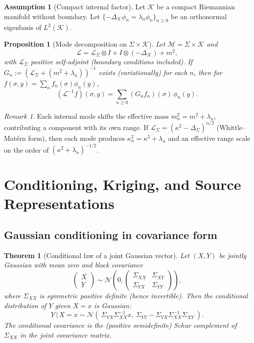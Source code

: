 \documentclass[11pt]{article}
\theoremstyle{definition}
\newtheorem{assumption}{Assumption}[section]
\theoremstyle{plain}
\newtheorem{theorem}{Theorem}[section]
\newtheorem{proposition}{Proposition}[section]
\theoremstyle{remark}
\newtheorem{remark}{Remark}[section]
\begin{document}
\begin{assumption}[Compact internal factor]\label{ass:compact}
Let $\mathcal{K}$ be a compact Riemannian manifold without boundary.
Let $\{-\Delta_{\mathcal{K}}\phi_n=\lambda_n\phi_n\}_{n\ge 0}$ be an orthonormal eigenbasis of $L^2(\mathcal{K})$.
\end{assumption}

\begin{proposition}[Mode decomposition on $\Sigma\times\mathcal{K}$]\label{prop:kk}
Let $\mathcal{M}=\Sigma\times\mathcal{K}$ and
\[
\mathcal{L}=\mathcal{L}_\Sigma\otimes I + I\otimes(-\Delta_{\mathcal{K}})+m^2,
\]
with $\mathcal{L}_\Sigma$ positive self-adjoint (boundary conditions included).
If $G_n:=(\mathcal{L}_\Sigma+(m^2+\lambda_n))^{-1}$ exists (variationally) for each $n$, then
for $f(\sigma,y)=\sum_n f_n(\sigma)\phi_n(y)$,
\[
(\mathcal{L}^{-1}f)(\sigma,y)=\sum_{n\ge 0} (G_n f_n)(\sigma)\,\phi_n(y).
\]
\end{proposition}

\begin{remark}
Each internal mode shifts the effective mass $m_n^2=m^2+\lambda_n$, contributing a component with its own range.
If $\mathcal{L}_\Sigma=(\kappa^2-\Delta_\Sigma)^{\alpha/2}$ (Whittle--Mat\'ern form), then each mode produces
$\kappa_n^2=\kappa^2+\lambda_n$ and an effective range scale on the order of $(\kappa^2+\lambda_n)^{-1/2}$.
\end{remark}

\section{Conditioning, Kriging, and Source Representations}\label{sec:conditioning}

\subsection{Gaussian conditioning in covariance form}

\begin{theorem}[Conditional law of a joint Gaussian vector]\label{thm:condgauss}
Let $(X,Y)$ be jointly Gaussian with mean zero and block covariance
\[
\begin{pmatrix}X\\Y\end{pmatrix}\sim
\mathcal{N}\!\left(0,
\begin{pmatrix}
\Sigma_{XX} & \Sigma_{XY}\\
\Sigma_{YX} & \Sigma_{YY}
\end{pmatrix}
\right),
\]
where $\Sigma_{XX}$ is symmetric positive definite (hence invertible). Then the conditional distribution of $Y$ given $X=x$ is Gaussian:
\[
Y\,\big|\,X=x \sim \mathcal{N}\!\left(\ \Sigma_{YX}\Sigma_{XX}^{-1}x,\ \Sigma_{YY}-\Sigma_{YX}\Sigma_{XX}^{-1}\Sigma_{XY}\ \right).
\]
The conditional covariance is the (positive semidefinite) Schur complement of $\Sigma_{XX}$ in the joint covariance matrix.
\end{theorem}
\end{document}

